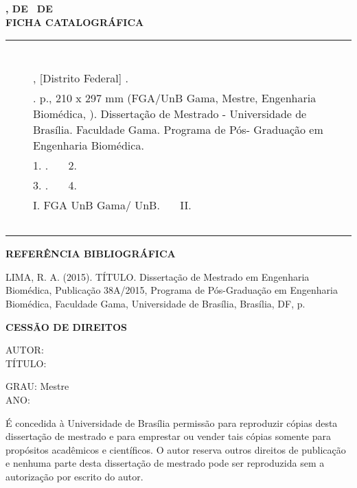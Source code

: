\begin{fichacatalografica}
\begin{flushleft}
    \textbf{\imprimirlocal, \imprimirdia DE \imprimirmes\, DE \imprimirdata} \\
       	    \vspace{0.25 in}
	\textbf{FICHA CATALOGRÁFICA}\\
	\begin{tabular}{c|p{}p{13.5cm}|}
	\multicolumn{3}{l}{~~~ } \\ \cline{2-3} 
	& & \\
	& & \imprimirautor \\
	& & \imprimirtitulo, [Distrito Federal] \imprimirdata.\\
	& & \imprimirpublicacao. \pageref{LastPage} p., 210 x 297 mm (FGA/UnB Gama, Mestre, Engenharia Biomédica, \imprimirdata).
	Dissertação de Mestrado - Universidade de Brasília. 
	Faculdade Gama. Programa de Pós- Graduação em Engenharia Biomédica.\\
	& & 1. \imprimirpalavrachaveum. ~~~2. \imprimirpalavrachavedois \\
	& & 3. \imprimirpalavrachavetres. ~~~4. \imprimirpalavrachavequatro \\
	& & I. FGA UnB Gama/ UnB. ~~~II.\imprimirtitulo \\
	 \cline{2-3}
	\multicolumn{3}{l}{~~~ } \\
	\end{tabular}
\end{flushleft}
	
\end{fichacatalografica}


\begin{flushleft}
\textbf{REFERÊNCIA BIBLIOGRÁFICA}\\
\end{flushleft}
LIMA, R. A. (2015). TÍTULO. Dissertação de Mestrado em Engenharia
Biomédica, Publicação 38A/2015, Programa de Pós-Graduação em Engenharia
Biomédica, Faculdade Gama, Universidade de Brasília, Brasília, DF, \pageref{LastPage} p.

\begin{flushleft}
 \textbf{CESSÃO DE DIREITOS}
 
AUTOR: \imprimirautor \\
TÍTULO: \imprimirtitulo\\
\vspace{0.25 in}

GRAU: Mestre\\
ANO: \imprimirdata

\end{flushleft}
É concedida à Universidade de Brasília permissão para reproduzir cópias desta dissertação
de mestrado e para emprestar ou vender tais cópias somente para propósitos acadêmicos e
científicos. O autor reserva outros direitos de publicação e nenhuma parte desta dissertação
de mestrado pode ser reproduzida sem a autorização por escrito do autor.

